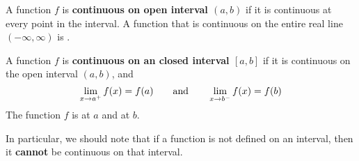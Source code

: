 \begin{definition} 
    A function $f$ is \textbf{continuous on  open interval $(a,b)$} if it is continuous at every point in the interval. A function that is continuous on the entire real line $(-\infty,\infty)$ is .
    \\\cite{mooc}
\end{definition}

\begin{definition} 
    A function $f$ is \textbf{continuous on an closed interval $[a,b]$} if it is continuous on the open interval $(a, b)$, and
    $$\displaystyle\lim\limits_{x\to a^+}f(x)=f(a)\qquad\text{and}\qquad\displaystyle\lim\limits_{x\to b^-}f(x)=f(b)$$
    The function $f$ is  at $a$ and  at $b$.
    \\\cite{ci}
\end{definition}

In particular, we should note that if a function is not defined on an interval, then it \textbf{cannot} be continuous on that interval. \cite{mooc}

